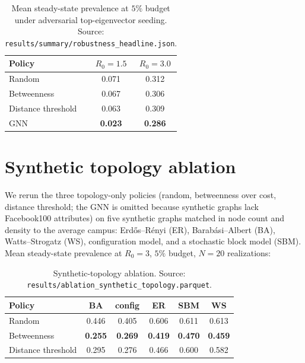 \documentclass{article}
\begin{document}
\begin{table}[h]
    \centering
    \small
    \begin{tabular}{lcc}
        \toprule
        Policy & $R_0 = 1.5$ & $R_0 = 3.0$ \\
        \midrule
        Random              & 0.071 & 0.312 \\
        Betweenness         & 0.067 & 0.306 \\
        Distance threshold  & 0.063 & 0.309 \\
        GNN                 & \textbf{0.023} & \textbf{0.286} \\
        \bottomrule
    \end{tabular}
    \caption{Mean steady-state prevalence at $5\%$ budget under
        adversarial top-eigenvector seeding. Source:
        \texttt{results/summary/robustness\_headline.json}.}
    \label{tab:adversarial}
\end{table}


\section{Synthetic topology ablation}
\label{app:synthetic}

We rerun the three topology-only policies (random, betweenness over
cost, distance threshold; the GNN is omitted because synthetic
graphs lack Facebook100 attributes) on five synthetic graphs
matched in node count and density to the average campus:
Erd\H{o}s--R\'enyi (ER), Barab\'asi--Albert (BA),
Watts--Strogatz (WS), configuration model, and a stochastic block
model (SBM). Mean steady-state prevalence at $R_0 = 3$, $5\%$
budget, $N = 20$ realizations:

\begin{table}[h]
    \centering
    \small
    \begin{tabular}{lccccc}
        \toprule
        Policy & BA & config & ER & SBM & WS \\
        \midrule
        Random              & 0.446 & 0.405 & 0.606 & 0.611 & 0.613 \\
        Betweenness         & \textbf{0.255} & \textbf{0.269} & \textbf{0.419} & \textbf{0.470} & \textbf{0.459} \\
        Distance threshold  & 0.295 & 0.276 & 0.466 & 0.600 & 0.582 \\
        \bottomrule
    \end{tabular}
    \caption{Synthetic-topology ablation. Source:
        \texttt{results/ablation\_synthetic\_topology.parquet}.}
    \label{tab:synthetic}
\end{table}
\end{document}
